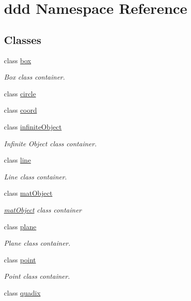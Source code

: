 \hypertarget{namespaceddd}{}\section{ddd Namespace Reference}
\label{namespaceddd}
\subsection*{Classes}
\begin{DoxyCompactItemize}
\item 
class \hyperlink{classddd_1_1box}{box}
\begin{DoxyCompactList}\small\item\em Box class container. \end{DoxyCompactList}\item 
class \hyperlink{classddd_1_1circle}{circle}
\item 
class \hyperlink{classddd_1_1coord}{coord}
\item 
class \hyperlink{classddd_1_1infinite_object}{infinite\+Object}
\begin{DoxyCompactList}\small\item\em Infinite Object class container. \end{DoxyCompactList}\item 
class \hyperlink{classddd_1_1line}{line}
\begin{DoxyCompactList}\small\item\em Line class container. \end{DoxyCompactList}\item 
class \hyperlink{classddd_1_1mat_object}{mat\+Object}
\begin{DoxyCompactList}\small\item\em \hyperlink{classddd_1_1mat_object}{mat\+Object} class container \end{DoxyCompactList}\item 
class \hyperlink{classddd_1_1plane}{plane}
\begin{DoxyCompactList}\small\item\em Plane class container. \end{DoxyCompactList}\item 
class \hyperlink{classddd_1_1point}{point}
\begin{DoxyCompactList}\small\item\em Point class container. \end{DoxyCompactList}\item 
class \hyperlink{classddd_1_1quadix}{quadix}

\end{DoxyCompactItemize}

